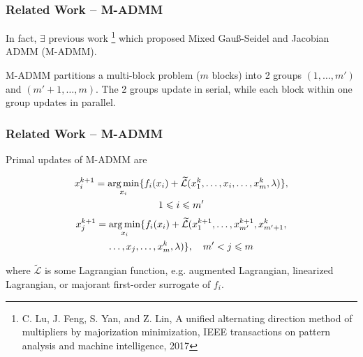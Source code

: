 
\begin{frame}
\frametitle{Related Work -- M-ADMM}

In fact, $\exists$ previous work \cite{lu2017unified}\footnote{C. Lu, J. Feng, S. Yan, and Z. Lin, A unified alternating direction method of multipliers by majorization minimization, IEEE transactions on pattern analysis and machine intelligence, 2017} which proposed Mixed Gau\ss-Seidel and Jacobian ADMM (M-ADMM).

\vspace{0.6em}

M-ADMM partitions a {\color{red} multi-block problem} ($m$ blocks) into 2 groups $(1,\ldots,m')$ and $(m'+1,\ldots,m)$. The 2 groups update {\color{red} in serial}, while each block within one group updates {\color{red} in parallel}.

\end{frame}


\begin{frame}
\frametitle{Related Work -- M-ADMM}

Primal updates of M-ADMM are
\begin{fleqn}
\begin{multline*}
    x_i^{k+1} = \operatorname*{arg\,min}_{x_i} \{ f_i(x_i) + \widetilde{\mathcal{L}}(x_1^{k},\ldots,x_i,\ldots,x_m^{k}, \lambda) \},\\
    1\leqslant i \leqslant m'
\end{multline*}
\begin{multline*}
    x_j^{k+1} = \operatorname*{arg\,min}_{x_i} \{ f_i(x_i) + \widetilde{\mathcal{L}}(x_1^{k+1},\ldots,x_{m'}^{k+1},x_{m'+1}^{k},\\
    \ldots,x_j,\ldots,x_m^{k}, \lambda) \}, \quad m' < j \leqslant m
\end{multline*}
\end{fleqn}
where $\widetilde{\mathcal{L}}$ is some Lagrangian function, e.g. augmented Lagrangian, linearized Lagrangian, or {\color{red} majorant first-order surrogate} of $f_i$.

\end{frame}


